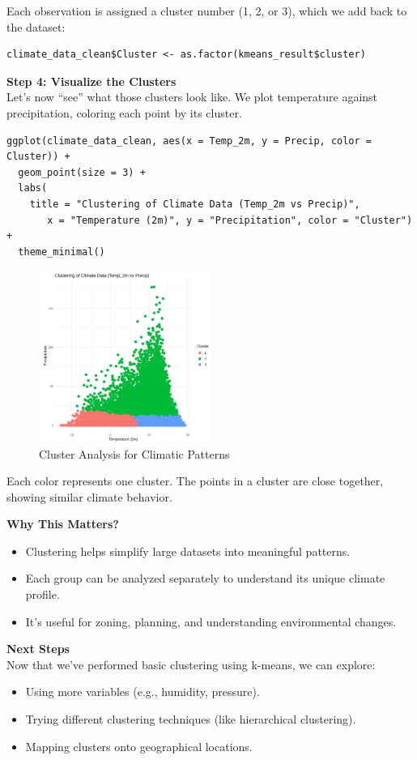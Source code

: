 Each observation is assigned a cluster number (1, 2, or 3), which we add back to the dataset:
\begin{verbatim}
climate_data_clean$Cluster <- as.factor(kmeans_result$cluster)
\end{verbatim}

\textbf{Step 4: Visualize the Clusters} \\
Let’s now “see” what those clusters look like. We plot temperature against precipitation, coloring each point by its cluster.
\begin{verbatim}
ggplot(climate_data_clean, aes(x = Temp_2m, y = Precip, color = Cluster)) +
  geom_point(size = 3) +
  labs(
    title = "Clustering of Climate Data (Temp_2m vs Precip)", 
       x = "Temperature (2m)", y = "Precipitation", color = "Cluster") +
  theme_minimal()
\end{verbatim}

\begin{figure}[h]
\centering
\includegraphics[width=0.5\textwidth]{figures/cluster.jpg}
\caption{Cluster Analysis for Climatic Patterns}
\end{figure}

Each color represents one cluster. The points in a cluster are close together, showing similar climate behavior.

\textbf{Why This Matters?}
\begin{itemize}
\item Clustering helps simplify large datasets into meaningful patterns. 
\item Each group can be analyzed separately to understand its unique climate profile. 
\item It’s useful for zoning, planning, and understanding environmental changes.
\end{itemize}

\textbf{Next Steps}\\

Now that we’ve performed basic clustering using k-means, we can explore:
\begin{itemize}
    \item Using more variables (e.g., humidity, pressure).
    \item Trying different clustering techniques (like hierarchical clustering).
    \item Mapping clusters onto geographical locations.
\end{itemize}
